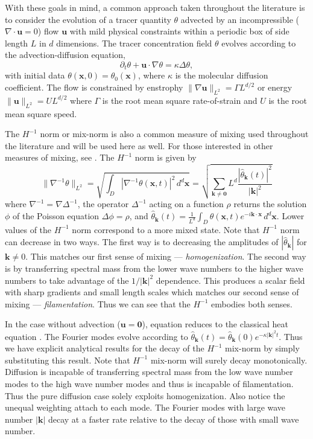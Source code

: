 \documentclass[12pt]{iopart}
\newcommand{\hmone}[1]{\|\nabla^{-1} #1\|_{L^{2}}}
\newcommand{\ltwo}[1]{\|#1\|_{L^{2}}}
\newcommand{\sint}[1]{\int_{D} #1 \, d^{d}\mathbf{x}}
\renewcommand{\vec}[1]{\mathbf{#1}}
\renewcommand{\u}{\mathbf{u}}
\newcommand{\ppt}[1]{\partial_{t} #1}
\newcommand{\lap}{\Delta }
\begin{document}
With these goals in mind, a common approach taken throughout the literature is to consider the evolution of a tracer quantity $\theta$ advected by an incompressible ($\nabla \cdot\vec{u}=0$) flow $\vec{u}$ with mild physical constraints within a periodic box  of side length $L$ in $d$ dimensions. The tracer concentration field $\theta$ evolves according to the advection-diffusion equation,
\begin{equation}
	\label{eq:PDE_advection}
	\ppt{\theta}+\mathbf{u}\cdot \nabla \theta=\kappa \lap\theta,
\end{equation}
with initial data $\theta(\mathbf{x},0)=\theta_{0}(\mathbf{x})$, where $\kappa$ is the molecular diffusion coefficient. The flow is constrained by enstrophy $\ltwo{\nabla\u} = \Gamma L^{d/2}$ or energy $\ltwo{\u} = UL^{d/2}$ where $\Gamma$ is the root mean square rate-of-strain and $U$ is the root mean square speed. 


The $H^{-1}$ norm or mix-norm \cite{GM2005} is also a common measure of mixing used throughout the literature and will be used here as well. For those interested in other measures of mixing, see \cite{JLT2012}. The $H^{-1}$ norm is given by  
%
\begin{equation}
\hmone{\theta}=\sqrt{\sint{ |\nabla^{-1} \theta( \vec{x},t)|^2}}=\sqrt{ \sum_{\vec{k}\neq \vec{0}} L^d \frac{|\hat{\theta}_{\vec{k}}(t)|^{2}}{|\vec{k}|^2}}
\end{equation}
%
where $\nabla^{-1}=\nabla \Delta^{-1}$, the operator $\Delta^{-1}$ acting on  a function $\rho$ returns the solution $\phi$ of the Poisson equation $ \Delta \phi = \rho $, and $\hat{\theta}_{\vec{k}}(t) =  \frac{1}{L^{d}}\sint{\theta(\vec{x},t)e^{-i\vec{k}\cdot\vec{x}}}$.  Lower values of the  $H^{-1}$ norm correspond to a more mixed state. Note that $H^{-1}$ norm can decrease in two ways. The first way is to decreasing the amplitudes of $|\hat{\theta}_{\vec{k}}|$ for $\vec{k}\neq 0$. This matches our first sense of mixing --- {\it homogenization}. The second way is by transferring spectral mass from the lower wave numbers to the higher wave numbers to take advantage of the $1/|\vec{k}|^2$ dependence. This produces a scalar field with sharp gradients and small length scales which matches our second sense of mixing --- {\it filamentation}. Thus we can see that the $H^{-1}$ embodies both senses. 

In the case without advection ($\vec{u}=\vec{0}$), equation  reduces to the classical heat equation \cite{Evans2010}. The Fourier modes evolve according to $\hat{\theta}_{\vec{k}}(t)=\hat{\theta}_{\vec{k}}(0)e^{-\kappa|\vec{k}|^2t}$. Thus we have explicit analytical results for the decay of the $H^{-1}$ mix-norm by simply substituting this result. Note that $H^{-1}$ mix-norm will surely decay monotonically. Diffusion is incapable of transferring spectral mass from the low wave number modes to the high wave number modes and thus is incapable of filamentation. Thus the pure diffusion case solely exploits homogenization. Also notice the unequal weighting attach to each mode. The Fourier modes with large wave number $|\vec{k}|$ decay at a faster rate relative to the decay of those with small wave number.
\end{document}

